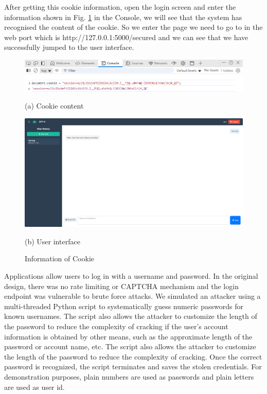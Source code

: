 \documentclass{article}
\begin{document}
After getting this cookie information, open the login screen and enter the information shown in Fig. \ref{fig:cookie} in the Console, we will see that the system has recognised the content of the cookie. 
So we enter the page we need to go to in the web port which is http://127.0.0.1:5000/secured and we can see that we have successfully jumped to the user interface.
\begin{figure}[htb]
    \begin{minipage}{0.5\textwidth}
        \centering
        \includegraphics[width=\textwidth]{images/cookie_content.png}
        \caption*{(a) Cookie content}
    \end{minipage}
    \hfill
    \begin{minipage}{0.5\textwidth}
        \centering
        \includegraphics[width=\textwidth]{images/user_interface.png}
        \caption*{(b) User interface}
    \end{minipage}
    \caption{Information of Cookie}
    \label{fig:cookie}
\end{figure}

Applications allow users to log in with a username and password. In the original design, there was no rate limiting or CAPTCHA\cite{10.1007/3-540-39200-9_18} mechanism and the login endpoint was vulnerable to brute force attacks. We simulated an attacker using a multi-threaded Python script to systematically guess numeric passwords for known usernames. The script also allows the attacker to customize the length of the password to reduce the complexity of cracking if the user's account information is obtained by other means, such as the approximate length of the password or account name, etc. The script also allows the attacker to customize the length of the password to reduce the complexity of cracking. Once the correct password is recognized, the script terminates and saves the stolen credentials. For demonstration purposes, plain numbers are used as passwords and plain letters are used as user id.
\end{document}
